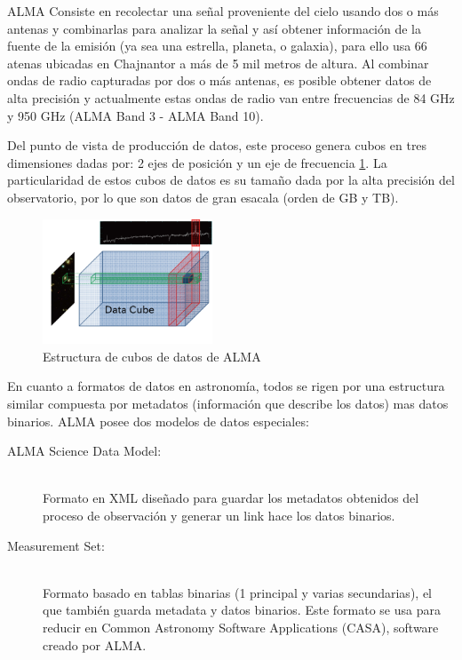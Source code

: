 ALMA Consiste en recolectar una señal proveniente del cielo usando dos o más
antenas y combinarlas para analizar la señal y así obtener información de la
fuente de la emisión (ya sea una estrella, planeta, o galaxia), para ello usa
66 atenas ubicadas en Chajnantor a más de 5 mil metros de altura. Al combinar
ondas de radio capturadas por dos o más antenas, es posible obtener datos de
alta precisión y actualmente estas ondas de radio van entre frecuencias de 84
GHz y 950 GHz (ALMA Band 3 - ALMA Band 10). 

Del punto de vista de producción de datos, este proceso genera cubos en tres
dimensiones dadas por: 2 ejes de posición y un eje de frecuencia
\ref{fig:cube}. La particularidad de estos cubos de datos es su tamaño dada por
la alta precisión del observatorio, por lo que son datos de gran esacala (orden
de GB y TB).

\begin{figure}[ht]
    \centering
    \includegraphics[width=0.45\textwidth]{images/cube.png}
    \caption{Estructura de cubos de datos de ALMA \cite{dent20132}}
    \label{fig:cube}
\end{figure}

En cuanto a formatos de datos en astronomía, todos se rigen por una estructura
similar compuesta por metadatos (información que describe los datos) mas datos
binarios. ALMA posee dos modelos de datos especiales:
\begin{description}
    \item[ALMA Science Data Model:] \hfill \\
        Formato en XML diseñado para guardar los metadatos obtenidos del
        proceso de observación y generar un link hace los datos binarios.
    \item[Measurement Set:] \hfill \\
        Formato basado en tablas binarias (1 principal y varias secundarias),
        el que también guarda metadata y datos binarios. Este formato se usa
        para reducir en Common Astronomy Software Applications (CASA), software
        creado por ALMA.
\end{description}

